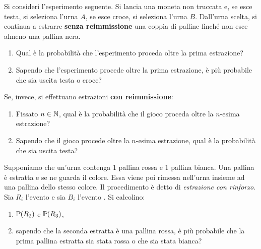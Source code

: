 Si consideri l'esperimento seguente. Si lancia una moneta non truccata e, se esce testa, si seleziona l'urna $A$, se esce croce, si seleziona l'urna $B$. Dall'urna scelta, si continua a estrarre \textbf{senza reimmissione} una coppia di palline finché non esce almeno una pallina nera.
\begin{enumerate}
	\item Qual è la probabilità che l'esperimento proceda oltre la prima estrazione?
	\item Sapendo che l'esperimento procede oltre la prima estrazione, è più probabile che sia uscita testa o croce?
\end{enumerate}
Se, invece, si effettuano estrazioni \textbf{con reimmissione}:
\begin{enumerate}
	\item Fissato $n\in \mathbb{N}$, qual è la probabilità che il gioco proceda oltre la $n$-esima estrazione?
	\item Sapendo che il gioco procede oltre la $n$-esima estrazione, qual è la probabilità che sia uscita testa?
\end{enumerate}


Supponiamo che un'urna contenga $1$ pallina rossa e $1$ pallina bianca. Una pallina è estratta e se ne guarda il colore. Essa viene poi rimessa nell'urna insieme ad una pallina dello stesso colore. Il procedimento è detto di \textit{estrazione con rinforzo}. Sia $R_{i}$ l'evento  e sia $B_{i}$ l'evento . Si calcolino:
\begin{enumerate}
	\item $\mathbb{P}(R_{2})$ e $\mathbb{P}(R_{3})$,
	\item sapendo che la seconda estratta è una pallina rossa, è più probabile che la prima pallina estratta sia stata rossa o che sia stata bianca?
\end{enumerate}


